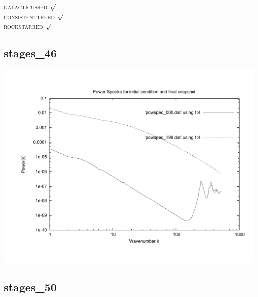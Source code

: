 \textsc{galacticussed} $\surd$ \\
\textsc{consistenttreed} $\surd$ \\ 
\textsc{rockstarred} $\surd$


% 
%
%
%
%
%
%
%


\newpage
\subsection{stages\_46}

\includegraphics[scale=0.5]{stages_46/plot_powspec_stages_46}


% 
%
%
%
%
%
%
%


\newpage
\subsection{stages\_50}

